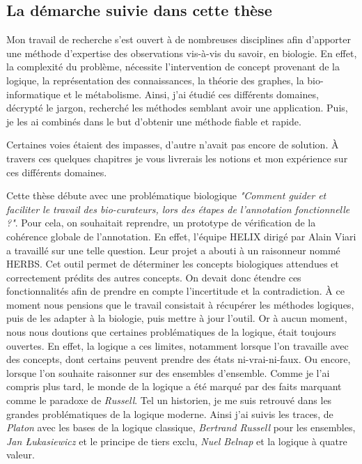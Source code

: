 \begin{refsection}
\section*{La démarche suivie dans cette thèse}

Mon travail de recherche s'est ouvert à de nombreuses disciplines afin d'apporter une méthode d'expertise des observations vis-à-vis du savoir, en biologie. En effet, la complexité du problème, nécessite l'intervention de concept provenant de la logique, la représentation des connaissances, la théorie des graphes, la bio-informatique et le métabolisme. Ainsi, j'ai étudié ces différents domaines, décrypté le jargon, recherché les méthodes semblant avoir une application. Puis, je les ai combinés dans le but d'obtenir une méthode fiable et rapide.

Certaines voies étaient des impasses, d'autre n'avait pas encore de solution. À travers ces quelques chapitres je vous livrerais les notions et mon expérience sur ces différents domaines.

Cette thèse débute avec une problématique biologique \textit{"Comment guider et faciliter le travail des bio-curateurs, lors des étapes de l'annotation fonctionnelle ?"}. Pour cela, on souhaitait reprendre, un prototype de vérification de la cohérence globale de l'annotation. En effet, l'équipe HELIX dirigé par Alain Viari a travaillé sur une telle question. Leur projet a abouti à un raisonneur nommé HERBS. Cet outil permet de déterminer les concepts biologiques attendues et correctement prédits des autres concepts. On devait donc étendre ces fonctionnalités afin de prendre en compte l'incertitude et la contradiction. À ce moment nous pensions que le travail consistait à récupérer les méthodes logiques, puis de les adapter à la biologie, puis mettre à jour l'outil. Or à aucun moment, nous nous doutions que certaines problématiques de la logique, était toujours ouvertes. En effet, la logique a ces limites, notamment lorsque l'on travaille avec des concepts, dont certains peuvent prendre des états ni-vrai-ni-faux. Ou encore, lorsque l'on souhaite raisonner sur des ensembles d'ensemble. Comme je l'ai compris plus tard, le monde de la logique a été marqué par des faits marquant comme le paradoxe de \textit{Russell}. Tel un historien, je me suis retrouvé dans les grandes problématiques de la logique moderne. Ainsi j'ai suivis les traces, de \textit{Platon} avec les bases de la logique classique, \textit{Bertrand Russell} pour les ensembles, \textit{Jan Łukasiewicz} et le principe de tiers exclu, \textit{Nuel Belnap} et la logique à quatre valeur.


\end{refsection}

